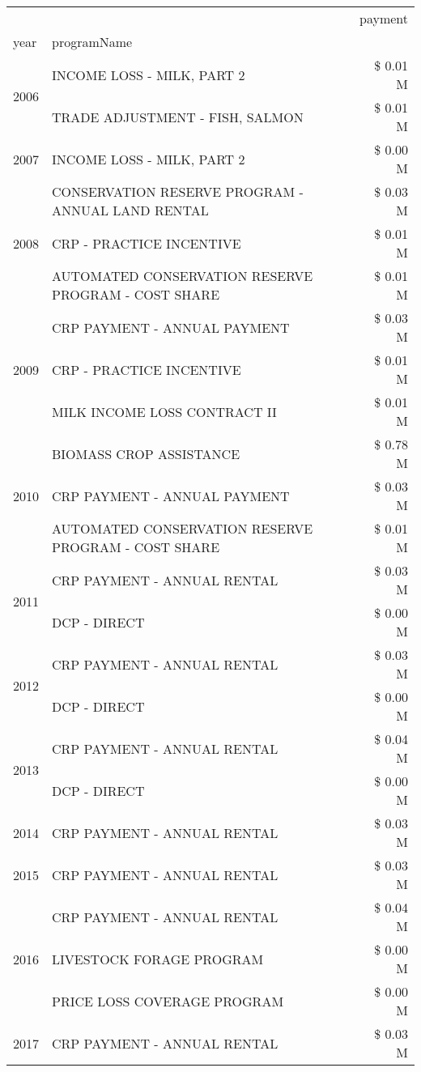 \begin{tabular}{llr}
\toprule
 &  & payment \\
year & programName &  \\
\midrule
\multirow[t]{2}{*}{2006} & INCOME LOSS - MILK, PART 2 & \$ 0.01 M \\
 & TRADE ADJUSTMENT - FISH, SALMON & \$ 0.01 M \\
\cline{1-3}
2007 & INCOME LOSS - MILK, PART 2 & \$ 0.00 M \\
\cline{1-3}
\multirow[t]{3}{*}{2008} & CONSERVATION RESERVE PROGRAM - ANNUAL LAND RENTAL & \$ 0.03 M \\
 & CRP - PRACTICE INCENTIVE & \$ 0.01 M \\
 & AUTOMATED CONSERVATION RESERVE PROGRAM - COST SHARE & \$ 0.01 M \\
\cline{1-3}
\multirow[t]{3}{*}{2009} & CRP PAYMENT - ANNUAL PAYMENT & \$ 0.03 M \\
 & CRP - PRACTICE INCENTIVE & \$ 0.01 M \\
 & MILK INCOME LOSS CONTRACT II & \$ 0.01 M \\
\cline{1-3}
\multirow[t]{3}{*}{2010} & BIOMASS CROP ASSISTANCE & \$ 0.78 M \\
 & CRP PAYMENT - ANNUAL PAYMENT & \$ 0.03 M \\
 & AUTOMATED CONSERVATION RESERVE PROGRAM - COST SHARE & \$ 0.01 M \\
\cline{1-3}
\multirow[t]{2}{*}{2011} & CRP PAYMENT - ANNUAL RENTAL & \$ 0.03 M \\
 & DCP - DIRECT & \$ 0.00 M \\
\cline{1-3}
\multirow[t]{2}{*}{2012} & CRP PAYMENT - ANNUAL RENTAL & \$ 0.03 M \\
 & DCP - DIRECT & \$ 0.00 M \\
\cline{1-3}
\multirow[t]{2}{*}{2013} & CRP PAYMENT - ANNUAL RENTAL & \$ 0.04 M \\
 & DCP - DIRECT & \$ 0.00 M \\
\cline{1-3}
2014 & CRP PAYMENT - ANNUAL RENTAL & \$ 0.03 M \\
\cline{1-3}
2015 & CRP PAYMENT - ANNUAL RENTAL & \$ 0.03 M \\
\cline{1-3}
\multirow[t]{3}{*}{2016} & CRP PAYMENT - ANNUAL RENTAL & \$ 0.04 M \\
 & LIVESTOCK FORAGE PROGRAM & \$ 0.00 M \\
 & PRICE LOSS COVERAGE PROGRAM & \$ 0.00 M \\
\cline{1-3}
\multirow[t]{2}{*}{2017} & CRP PAYMENT - ANNUAL RENTAL & \$ 0.03 M \\

\end{tabular}
